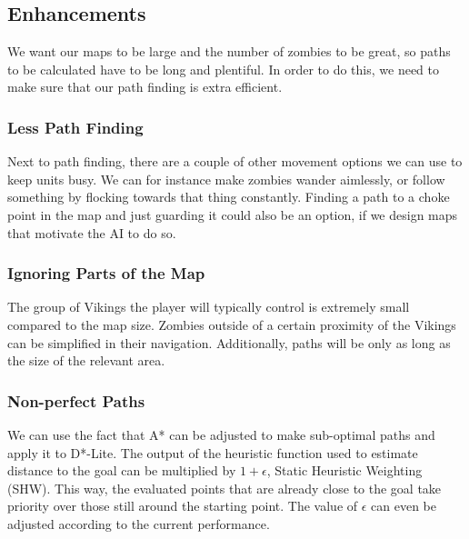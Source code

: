 \subsection{Enhancements}
We want our maps to be large and the number of zombies to be great, so paths to be calculated have to be long and plentiful. In order to do this, we need to make sure that our path finding is extra efficient.

\subsubsection{Less Path Finding}
Next to path finding, there are a couple of other movement options we can use to keep units busy. We can for instance make zombies wander aimlessly, or follow something by flocking towards that thing constantly. Finding a path to a choke point in the map and just guarding it could also be an option, if we design maps that motivate the AI to do so.

\subsubsection{Ignoring Parts of the Map}
The group of Vikings the player will typically control is extremely small compared to the map size. Zombies outside of a certain proximity of the Vikings can be simplified in their navigation. Additionally, paths will be only as long as the size of the relevant area.

\subsubsection{Non-perfect Paths}
We can use the fact that A* can be adjusted to make sub-optimal paths and apply it to D*-Lite. The output of the heuristic function used to estimate distance to the goal can be multiplied by $1 + \epsilon$, Static Heuristic Weighting (SHW). This way, the evaluated points that are already close to the goal take priority over those still around the starting point. The value of $\epsilon$ can even be adjusted according to the current performance.